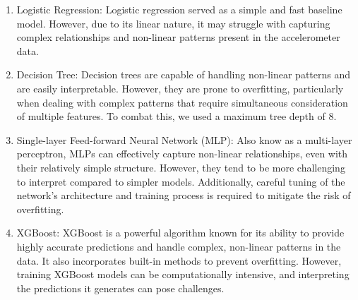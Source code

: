 \documentclass[
  10pt,
]{scrbook}
\begin{document}
\begin{enumerate}
\def\labelenumi{\arabic{enumi}.}
\item
  Logistic Regression: Logistic regression served as a simple and fast
  baseline model. However, due to its linear nature, it may struggle
  with capturing complex relationships and non-linear patterns present
  in the accelerometer data.
\item
  Decision Tree: Decision trees are capable of handling non-linear
  patterns and are easily interpretable. However, they are prone to
  overfitting, particularly when dealing with complex patterns that
  require simultaneous consideration of multiple features. To combat
  this, we used a maximum tree depth of 8.
\item
  Single-layer Feed-forward Neural Network (MLP): Also know as a
  multi-layer perceptron, MLPs can effectively capture non-linear
  relationships, even with their relatively simple structure. However,
  they tend to be more challenging to interpret compared to simpler
  models. Additionally, careful tuning of the network's architecture and
  training process is required to mitigate the risk of overfitting.
\item
  XGBoost: XGBoost is a powerful algorithm known for its ability to
  provide highly accurate predictions and handle complex, non-linear
  patterns in the data. It also incorporates built-in methods to prevent
  overfitting. However, training XGBoost models can be computationally
  intensive, and interpreting the predictions it generates can pose
  challenges.
\end{enumerate}
\end{document}
